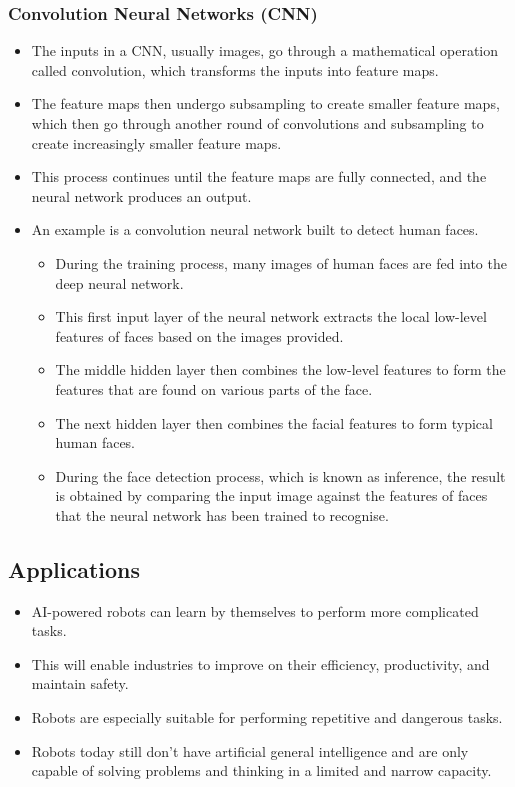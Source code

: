 \documentclass[11pt]{article}
\begin{document}
\subsubsection{Convolution Neural Networks (CNN)}
\label{sec:org194ced7}
\begin{itemize}
\item The inputs in a CNN, usually images, go through a mathematical operation called convolution, which transforms the inputs into feature maps.
\item The feature maps then undergo subsampling to create smaller feature maps, which then go through another round of convolutions and subsampling to create increasingly smaller feature maps.
\item This process continues until the feature maps are fully connected, and the neural network produces an output.
\item An example is a convolution neural network built to detect human faces.
\begin{itemize}
\item During the training process, many images of human faces are fed into the deep neural network.
\item This first input layer of the neural network extracts the local low-level features of faces based on the images provided.
\item The middle hidden layer then combines the low-level features to form the features that are found on various parts of the face.
\item The next hidden layer then combines the facial features to form typical human faces.
\item During the face detection process, which is known as inference, the result is obtained by comparing the input image against the features of faces that the neural network has been trained to recognise.
\end{itemize}
\end{itemize}

 \newpage

\subsection{Applications}
\label{sec:org7e6f20a}
\begin{itemize}
\item AI-powered robots can learn by themselves to perform more complicated tasks.
\item This will enable industries to improve on their efficiency, productivity, and maintain safety.
\item Robots are especially suitable for performing repetitive and dangerous tasks.
\item Robots today still don't have artificial general intelligence and are only capable of solving problems and thinking in a limited and narrow capacity.
\end{itemize}
\end{document}
